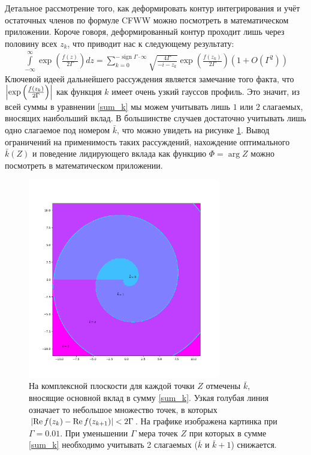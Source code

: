 \documentclass[a4paper, 12pt]{article}
\DeclareMathOperator*{\sign}{sign}
\DeclareMathOperator*{\Real}{Re}
\newenvironment{eqw}{\begin{equation} \begin{aligned}}   
    {\end{aligned}    \end{equation}}
\begin{document}
Детальное рассмотрение того, как деформировать контур интегрирования и учёт остаточных членов по формуле CFWW можно посмотреть в математическом приложении. Короче говоря, деформированный контур проходит лишь через половину всех $z_k$, что приводит нас к следующему результату:
\begin{eqw}\label{sum_k}
    \int\limits_{-\infty}^{\infty}\exp\left(\frac{f(z)}{2\Gamma}\right)dz = \sum\limits_{k=0}^{-\sign\Gamma \cdot \infty} \sqrt{\frac{4\Gamma}{{-i-z_k}}}\exp\left(\frac{ f(z_k)}{2\Gamma} \right)\left(1+O(\Gamma^2)\right)
\end{eqw}
Ключевой идеей дальнейшего рассуждения является замечание того факта, что $\abs{\exp\left(\frac{ f(z_k)}{2\Gamma} \right)}$ как функция $k$ имеет очень узкий гауссов профиль. Это значит, из всей суммы в уравнении \ref{sum_k} мы можем учитывать лишь $1$ или $2$ слагаемых, вносящих наибольший вклад. В большинстве случаев достаточно учитывать лишь одно слагаемое под номером $\bar{k}$, что можно увидеть на рисунке \ref{where_best_k_bar2}. Вывод ограничений на применимость таких рассуждений, нахождение оптимального $\bar{k}(Z)$ и поведение лидирующего вклада как функцию $\Phi=\arg Z$ можно посмотреть в математическом приложении. 
\begin{figure}
    \centering
    \includegraphics[width=0.75\textwidth]{where_best_k_bar2.png}
    \caption{На комплексной плоскости для каждой точки $Z$ отмечены $\bar{k}$, вносящие основной вклад в сумму \ref{sum_k}. Узкая голубая линия означает то небольшое множество точек, в которых $\abs{\Real f(z_k) - \Real f(z_{k+1})}<2\Gamma$. На графике изображена картинка при $\Gamma=0.01$. При уменьшении $\Gamma$ мера точек $Z$ при которых в сумме \ref{sum_k} необходимо учитывать 2 слагаемых ($\bar{k}$ и $\bar{k}+1$) снижается.}\label{where_best_k_bar2}
\end{figure}
\end{document}
